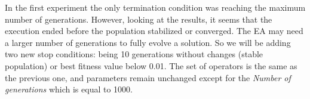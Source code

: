 \documentclass[sigconf]{acmart}
\begin{document}
In the first experiment the only termination condition was reaching the maximum 
number of generations. %
However, looking at the results, it seems that the 
execution ended before the population stabilized or converged.
The EA may need a 
larger number of generations to fully evolve a solution.
So we will be adding two new stop 
conditions: being 10 generations without changes (stable population) or best 
fitness value below 0.01. 
The set of operators is the same as the previous one, and parameters remain 
unchanged except for the \textit{Number of generations} which is equal to 1000. 
\end{document}

